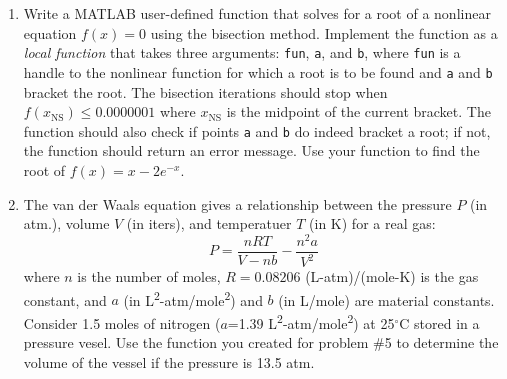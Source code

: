 \begin{fullwidth}
\begin{enumerate}
\item Write a MATLAB user-defined function that solves for a root of a nonlinear equation $f(x)=0$ using the bisection method.  Implement the function as a \emph{local function} that takes three arguments: \lstinline[style=myMatlab]{fun}, \lstinline[style=myMatlab]{a}, and \lstinline[style=myMatlab]{b}, where \lstinline[style=myMatlab]{fun} is a handle to the nonlinear function for which a root is to be found and \lstinline[style=myMatlab]{a} and \lstinline[style=myMatlab]{b} bracket the root.  The bisection iterations should stop when $f(x_{\text{NS}})\le 0.0000001$ where $x_{\text{NS}}$ is the midpoint of the current bracket.  The function should also check if points \lstinline[style=myMatlab]{a} and \lstinline[style=myMatlab]{b} do indeed bracket a root; if not, the function should return an error message.  Use your function to find the root of $f(x) = x-2e^{-x}$.  


\vspace{2.0cm}
\item The van der Waals equation gives a relationship between the pressure $P$ (in atm.), volume $V$ (in iters), and temperatuer $T$ (in K) for a real gas:
\begin{equation}
P = \frac{nRT}{V-nb}-\frac{n^2 a}{V^2}
\label{eq:ass1n-van-der-waals}
\end{equation}
where $n$ is the number of moles, $R=0.08206$ (L-atm)/(mole-K) is the gas constant, and $a$ (in L\textsuperscript{2}-atm/mole\textsuperscript{2}) and $b$ (in L/mole) are material constants.  Consider 1.5 moles of nitrogen ($a$=1.39 L\textsuperscript{2}-atm/mole\textsuperscript{2}) at 25$^{\circ}$C stored in a pressure vesel.  Use the function you created for problem \#5 to determine the volume of the vessel if the pressure is 13.5 atm.


\end{enumerate}

\end{fullwidth}
